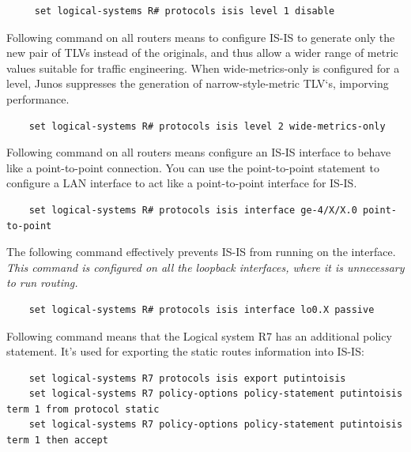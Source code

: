 \documentclass[a4paper]{article}
\begin{document}

\begin{verbatim}
     set logical-systems R# protocols isis level 1 disable
\end{verbatim}



Following command on all routers means to configure IS-IS to generate only the new pair of TLVs instead of the originals, and thus allow a wider range of metric values suitable for traffic engineering. When wide-metrics-only is configured for a level, Junos suppresses the generation of narrow-style-metric TLV`s, imporving performance.

\begin{verbatim}    
    set logical-systems R# protocols isis level 2 wide-metrics-only
\end{verbatim}

Following command on all routers means configure an IS-IS interface to behave like a point-to-point connection. You can use the point-to-point statement to configure a LAN interface to act like a point-to-point interface for IS-IS.

\begin{verbatim}    
    set logical-systems R# protocols isis interface ge-4/X/X.0 point-to-point
\end{verbatim}


The following command effectively prevents IS-IS from running on the interface. \textit{This command is configured on all the loopback interfaces, where it is unnecessary to run routing.}

\begin{verbatim}    
    set logical-systems R# protocols isis interface lo0.X passive
\end{verbatim}


Following command means that the Logical system R7 has an additional policy statement. It's used for exporting the static routes information into IS-IS:

\begin{verbatim}
    set logical-systems R7 protocols isis export putintoisis
    set logical-systems R7 policy-options policy-statement putintoisis term 1 from protocol static 
    set logical-systems R7 policy-options policy-statement putintoisis term 1 then accept
\end{verbatim}
\end{document}
